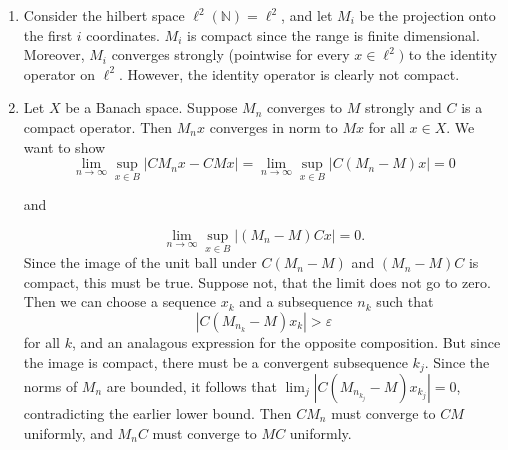 \documentclass[11pt, reqno]{article}
\theoremstyle{plain}
\theoremstyle{definition}
\theoremstyle{remark}
\renewcommand{\epsilon}{\varepsilon}
\begin{document}
\begin{enumerate}
    \item[8.] Consider the hilbert space $\ell^2(\mathbb{N}) = \ell^2$, and let $M_i$ be the projection onto 
    the first $i$ coordinates. $M_i$ is compact since the range is finite dimensional. Moreover, $M_i$ converges
    strongly (pointwise for every $x \in \ell^2)$ to the identity operator on $\ell^2$. However, the identity operator
    is clearly not compact. 

    \item[9.] Let $X$ be a Banach space. Suppose $M_n$ converges to $M$ strongly and $C$ is a compact operator. Then
    $M_n x$ converges in norm to $Mx$ for all $x \in X$. We want to show 
    \[
        \lim_{n \to \infty}\sup_{x \in B}|CM_n x - CM x| = \lim_{n \to \infty} \sup_{x \in B}|C(M_n - M)x| = 0
    \]

    and

    \[
        \lim_{n \to \infty}\sup_{x \in B}|(M_n - M)Cx| = 0.
    \]
    Since the image of the unit ball under $C(M_n - M)$ and $(M_n - M)C$ is compact, this must be true. Suppose not,
    that the limit does not go to zero. Then we can choose a sequence $x_k$ and a subsequence $n_k$ such that
    \[
        |C(M_{n_k} - M)x_k| > \epsilon
    \]
    for all $k$, and an analagous expression for the opposite composition. But since the image is compact, there must 
    be a convergent subsequence $k_j$. Since the norms of $M_n$ are bounded, it follows that $\lim_j |C(M_{n_{k_j}} - M)x_{k_j}| = 0$,
    contradicting the earlier lower bound. Then $CM_n$ must converge to $CM$ uniformly, and $M_n C$ must converge
    to $MC$ uniformly. 

\end{enumerate}
\end{document}
